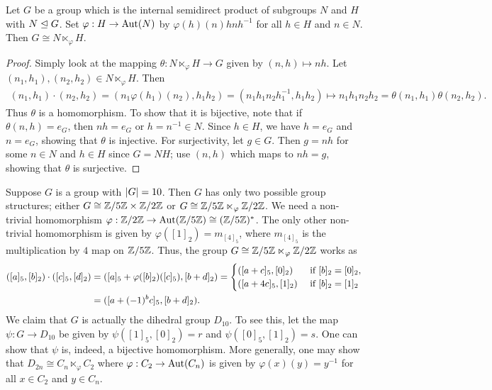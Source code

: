 \begin{proposition}
    Let $G$ be a group which is the internal semidirect product of subgroups $N$ and $H$ with $N \trianglelefteq G$. Set $\varphi:H \to \operatorname{Aut}(N)$ by $\varphi(h)(n) hnh^{-1}$ for all $h \in H$ and $n \in N$. Then $G \cong N \ltimes_{\varphi} H$.
\end{proposition}
\begin{proof}
    Simply look at the mapping $\theta:N \ltimes_{\varphi} H \to G$ given by $(n,h) \mapsto nh$. Let $(n_{1},h_{1}),(n_{2},h_{2}) \in N \ltimes_{\varphi} H$. Then
    \begin{align}
        (n_{1},h_{1}) \cdot (n_{2},h_{2}) = (n_{1}\varphi(h_{1})(n_{2}),h_{1}h_{2}) = (n_{1}h_{1}n_{2}h_{1}^{-1},h_{1}h_{2}) \mapsto n_{1}h_{1}n_{2}h_{2} = \theta(n_{1},h_{1})\theta(n_{2},h_{2}).
    \end{align}
    Thus $\theta$ is a homomorphism. To show that it is bijective, note that if $\theta(n,h) = e_{G}$, then $nh = e_{G}$ or $h = n^{-1} \in N$. Since $h \in H$, we have $h = e_{G}$ and $n = e_{G}$, showing that $\theta$ is injective. For surjectivity, let $g \in G$. Then $g = nh$ for some $n \in N$ and $h \in H$ since $G = NH$; use $(n,h)$ which maps to $nh = g$, showing that $\theta$ is surjective.
\end{proof}


\begin{example}
    Suppose $G$ is a group with $\left| G \right| = 10$. Then $G$ has only two possible group structures; either $G \cong \mathbb{Z}/5\mathbb{Z} \times \mathbb{Z}/2\mathbb{Z}$ or $G \cong \mathbb{Z}/5\mathbb{Z} \ltimes_{\varphi} \mathbb{Z}/2\mathbb{Z}$. We need a non-trivial homomorphism $\varphi:\mathbb{Z}/2\mathbb{Z} \to \operatorname{Aut}(\mathbb{Z}/5\mathbb{Z}) \cong (\mathbb{Z}/5\mathbb{Z})^{\ast}$. The only other non-trivial homomorphism is given by $\varphi([1]_{2}) = m_{[4]_{5}}$, where $m_{[4]_{5}}$ is the multiplication by $4$ map on $\mathbb{Z}/5\mathbb{Z}$. Thus, the group $G \cong \mathbb{Z}/5\mathbb{Z} \ltimes_{\varphi} \mathbb{Z}/2\mathbb{Z}$ works as
    \begin{align}
        ([a]_{5},[b]_{2}) \cdot ([c]_{5},[d]_{2}) &= ([a]_{5} + \varphi([b]_{2})([c]_{5}),[b+d]_{2}) = \begin{cases}
            ([a+c]_{5},[0]_{2}) &\text{ if } [b]_{2} = [0]_{2},\\
            ([a+4c]_{5},[1]_{2}) &\text{ if } [b]_{2} = [1]_{2}
        \end{cases} \notag \\ &= ([a + (-1)^{b}c]_{5},[b+d]_{2}).
    \end{align}
    We claim that $G$ is actually the dihedral group $D_{10}$. To see this, let the map $\psi:G \to D_{10}$ be given by $\psi([1]_{5},[0]_{2}) = r$ and $\psi([0]_{5},[1]_{2}) = s$. One can show that $\psi$ is, indeed, a bijective homomorphism. More generally, one may show that $D_{2n} \cong C_{n} \ltimes_{\varphi} C_{2}$ where $\varphi:C_{2} \to \operatorname{Aut}(C_{n})$ is given by $\varphi(x)(y) = y^{-1}$ for all $x \in C_{2}$ and $y \in C_{n}$.
\end{example}

